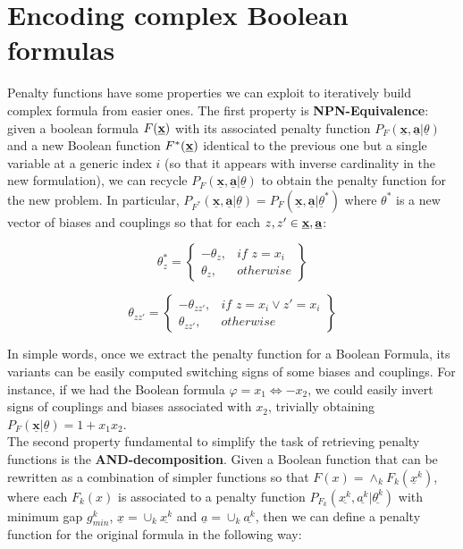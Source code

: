 \section{Encoding complex Boolean formulas}

 Penalty functions have some properties we can exploit to iteratively build complex formula from easier ones. The first property is \textbf{NPN-Equivalence}: given a boolean formula $F(\textbf{\underline{x}})$ with its associated penalty function $P_F(\underline{\textbf{x}},\underline{\textbf{a}} | \underline{\theta})$ and a new Boolean function $F^*(\textbf{\underline{x}})$ identical to the previous one but a single variable at a generic index $i$ (so that it appears with inverse cardinality in the new formulation), we can recycle $P_F(\underline{\textbf{x}},\underline{\textbf{a}} | \underline{\theta})$ to obtain the penalty function for the new problem. In particular, $P_{F^*}(\underline{\textbf{x}},\underline{\textbf{a}} | \underline{\theta}) = P_F(\underline{\textbf{x}},\underline{\textbf{a}} | \underline{\theta}^*)$ where $\theta^*$ is a new vector of biases and couplings so that for each $z,z'\in \textbf{\underline{x}},\textbf{\underline{a}}$:

\begin{equation}
    \theta_z^* = 
    \left\{
        \begin{array}{lr}
            -\theta_z, & \textit{if }z = x_i \\
            \theta_z, & otherwise
        \end{array}
    \right\}
\end{equation}

\begin{equation}
    \theta_{zz'} = 
    \left\{
        \begin{array}{lr}
            -\theta_{zz'}, & \textit{if }z = x_i \vee z' = x_i\\
            \theta_{zz'}, & otherwise
        \end{array}
    \right\}
\end{equation}


In simple words, once we extract the penalty function for a Boolean Formula, its variants can be easily computed switching signs of some biases and couplings. For instance, if we had the Boolean formula $\varphi = x_1 \iff -x_2$, we could easily invert signs of couplings and biases associated with $x_2$, trivially obtaining $P_F(\underline{\textbf{x}} | \underline{\theta}) = 1 + x_1x_2$. \\
The second property fundamental to simplify the task of retrieving penalty functions is the \textbf{AND-decomposition}. Given a Boolean function that can be rewritten as a combination of simpler functions so that $F(x) = \land_k F_k(\underline{x}^k)$, where each $F_k(x)$ is associated to a penalty function $P_{F_k}(\underline{x^k},\underline{a^k}|\underline{\theta^k})$ with minimum gap $g^k_{min}$, $\underline{x} = \cup_k \underline{x^k}$ and $\underline{a} = \cup_k \underline{a^k}$, then we can define a penalty function for the original formula in the following way:

